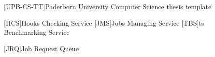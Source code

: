 \theoremstyle{plain}
\newtheorem{definition}{Definition}[chapter]
\newtheorem{lemma}[definition]{Lemma}
\ifgerman
	\newtheorem{theorem}[definition]{Satz}
	\newtheorem{corollary}[definition]{Korollar}
	\newtheorem{example}[definition]{Beispiel}
\else
	\newtheorem{theorem}[definition]{Theorem}
	\newtheorem{corollary}[definition]{Corollary}
	\newtheorem{example}[definition]{Example}
\fi



\newcommand*{\eg}{e.\,g.}
\newcommand*{\ie}{i.\,e.}
\newcommand*{\cf}{c.\,f.}
\newcommand*{\etal}{et~al.}

[UPB-CS-TT]{Paderborn University Computer Science thesis template}

\DeclareMathOperator{\testop}{top}


\newcommand*{\ts}{\acl*{ts}}
\newcommand*{\tsp}{\aclp*{ts}}
\newcommand*{\iguana}{\textsc{IGUANA}}

[HCS]{Hooks Checking Service}
[JMS]{Jobs Managing Service}
[TBS]{\ts{} Benchmarking Service}

[JRQ]{Job Request Queue}


\lstset{
	basicstyle=\scriptsize\ttfamily,
	numbers=left
}